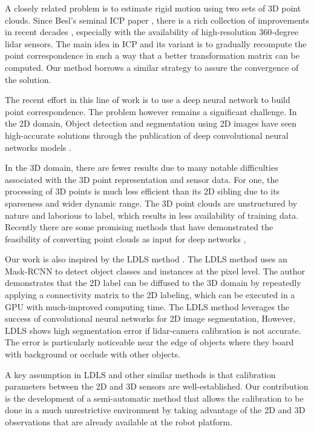 \documentclass{article}
\begin{document}
A closely related problem is to estimate rigid motion using two sets of 3D point clouds. Since Besl's seminal ICP paper \cite{icp}, there is a rich collection of improvements in recent decades \cite{gicp}, especially with the availability of high-resolution 360-degree lidar sensors. The main idea in ICP and its variant is to gradually recompute the point correspondence in such a way that a better transformation matrix can be computed. Our method borrows a similar strategy to assure the convergence of the solution.

The recent effort in this line of work is to use a deep neural network to build point correspondence. The problem however remains a significant challenge. In the 2D domain,
Object detection and segmentation using 2D images
have seen high-accurate solutions through the publication of deep
convolutional neural networks models \cite{ssd,mrcnn}.

In the 3D domain, there are fewer results due to many notable difficulties associated with the 3D point representation and sensor data. For one, the processing of 3D points is much less efficient than its 2D sibling due to its sparseness and wider dynamic range. The 3D point clouds are unstructured by nature
and laborious to label, which results in less availability of training data. Recently there are some promising methods that have demonstrated the feasibility of converting point clouds as input for deep
networks \cite{wu2017squeezeseg},

Our work is also inspired by the LDLS method \cite{wang2019ldls}. The LDLS method uses an Mask-RCNN \cite{mrcnn} to
detect object classes and instances at the pixel level.
The author demonstrates that the 2D label can be diffused to the 3D domain by repeatedly applying a connectivity matrix to the 2D labeling, which can be executed in a GPU with much-improved computing time. The LDLS method
leverages the success of convolutional neural networks for 2D
image segmentation, However, LDLS shows high segmentation error if lidar-camera calibration is not accurate. The error is particularly noticeable near the edge of objects where they board with background or occlude with other objects. 

A key assumption in LDLS and other similar methods is that calibration parameters between the 2D and 3D sensors are well-established. Our contribution is the development of a semi-automatic method that allows the calibration to be done in a much unrestrictive environment by taking advantage of the 2D and 3D observations that are already available at the robot platform.
\end{document}
